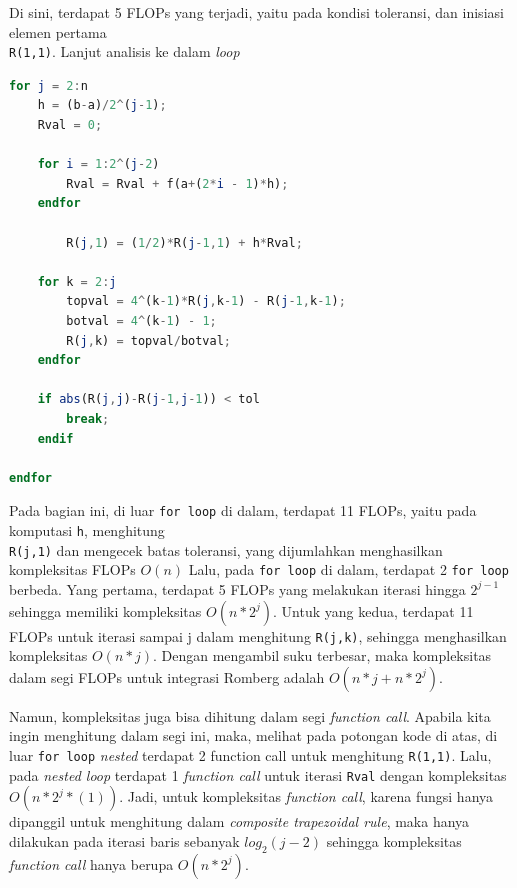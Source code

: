 \documentclass[journal,12pt,onecolumn,a4paper]{IEEEtran}
\begin{document}
Di sini, terdapat 5 FLOPs yang terjadi, yaitu pada kondisi toleransi, dan inisiasi elemen pertama \\ \lstinline{R(1,1)}. Lanjut analisis ke dalam \emph{loop}
\begin{center}
	\begin{lstlisting}[language=Octave]
for j = 2:n
	h = (b-a)/2^(j-1);
	Rval = 0;

	for i = 1:2^(j-2)
		Rval = Rval + f(a+(2*i - 1)*h);
	endfor

		R(j,1) = (1/2)*R(j-1,1) + h*Rval;

	for k = 2:j
		topval = 4^(k-1)*R(j,k-1) - R(j-1,k-1);
		botval = 4^(k-1) - 1;
		R(j,k) = topval/botval;
	endfor

	if abs(R(j,j)-R(j-1,j-1)) < tol
		break;
	endif

endfor
	\end{lstlisting}
\end{center}

\par Pada bagian ini, di luar \lstinline{for loop} di dalam, terdapat 11 FLOPs, yaitu pada komputasi \lstinline{h}, menghitung \\ \lstinline{R(j,1)} dan mengecek batas toleransi, yang dijumlahkan menghasilkan kompleksitas FLOPs \(O(n)\)
Lalu, pada \lstinline{for loop} di dalam, terdapat 2 \lstinline{for loop} berbeda. Yang pertama, terdapat 5 FLOPs yang melakukan iterasi hingga \(2^{j-1}\) sehingga memiliki kompleksitas \(O(n*2^j)\).
Untuk yang kedua, terdapat 11 FLOPs untuk iterasi sampai j dalam menghitung \lstinline{R(j,k)}, sehingga menghasilkan kompleksitas \(O(n*j)\). Dengan mengambil suku terbesar, maka kompleksitas dalam segi FLOPs untuk integrasi Romberg adalah \(O(n*j + n*2^j)\).

Namun, kompleksitas juga bisa dihitung dalam segi \emph{function call}. Apabila kita ingin menghitung dalam segi ini, maka, melihat pada potongan kode di atas, di luar \lstinline{for loop} \emph{nested} terdapat 2 function call untuk menghitung \lstinline{R(1,1)}.
Lalu, pada \emph{nested loop} terdapat 1 \emph{function call} untuk iterasi \lstinline{Rval} dengan kompleksitas \(O(n*2^j*(1))\). Jadi, untuk kompleksitas \emph{function call}, karena fungsi hanya dipanggil untuk menghitung dalam \emph{composite trapezoidal rule}, maka hanya dilakukan pada iterasi baris sebanyak \(log_2 (j-2)\) sehingga kompleksitas \emph{function call} hanya berupa \(O(n*2^j)\).
\end{document}
